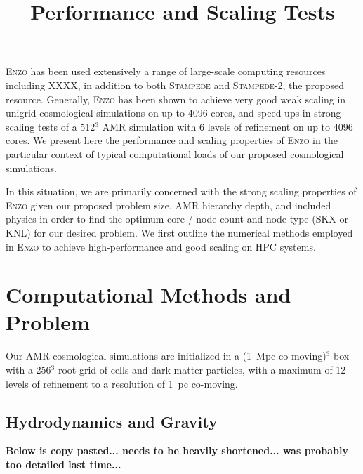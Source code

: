 \documentclass[12pt]{article} %
\title{\vspace{-5ex} Performance and Scaling Tests
       \vspace{-2ex}}
\begin{document}
 \thispagestyle{empty}


\maketitle

\textsc{Enzo} has been used extensively a range of large-scale computing resources including XXXX, in addition to both \textsc{Stampede} and \textsc{Stampede-2}, the proposed resource. Generally, \textsc{Enzo} has been shown to achieve very good weak scaling in unigrid cosmological simulations on up to 4096 cores, and speed-ups in strong scaling tests of a 512$^3$ AMR simulation with 6 levels of refinement on up to 4096 cores. We present here the performance and scaling properties of \textsc{Enzo} in the particular context of typical computational loads of our proposed cosmological simulations. 

In this situation, we are primarily concerned with the strong scaling properties of \textsc{Enzo} given our proposed problem size, AMR hierarchy depth, and included physics in order to find the optimum core / node count and node type (SKX or KNL) for our desired problem. We first outline the numerical methods employed in \textsc{Enzo} to achieve high-performance and good scaling on HPC systems.

\section{Computational Methods and Problem}

Our AMR cosmological simulations are initialized in a (1~Mpc co-moving)$^3$ box with a 256$^3$ root-grid of cells and dark matter particles, with a maximum of 12 levels of refinement to a resolution of 1~pc co-moving. 

\subsection{Hydrodynamics and Gravity}
\textbf{Below is copy pasted... needs to be heavily shortened... was probably too detailed last time...}
\end{document}
